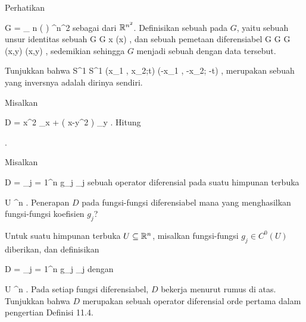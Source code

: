{}
{

Perhatikan

\mavergleichskette
{\vergleichskette
{G
}
{ = }{ _{  n   } \! \left(  \R  \right)
}
{ \subseteq }{ \R^{n^2}
}
{    }{
}
{   }{
}
}
{}{}{}
sebagai
dari ${\mathbb R}^{n^2}$. Definisikan sebuah  {} pada $G$, yaitu sebuah unsur identitas
 sebuah
\maabbeledisp {\alpha} { G } { G
} { x } { \alpha (x)
} {,}
dan sebuah pemetaan diferensiabel
\maabbeledisp {\varphi} {G \times G} {G
} {(x,y)} { \varphi(x,y)
} {,}
sedemikian sehingga $G$ menjadi sebuah
dengan data tersebut.

}
{} {}

{}
{

Tunjukkan bahwa
\maabbeledisp {\varphi} {S^1 \times \R } { S^1 \times \R
} {(x_1 , x_2;t)} {(-x_1 , -x_2; -t)
} {,}
merupakan sebuah
 yang inversnya adalah dirinya sendiri.

}
{} {}

{}
{

Misalkan

\mavergleichskette
{\vergleichskette
{ D
}
{ = }{ x^2 \partial_x +  \left(  x-y^2  \right) \partial_y
}
{  }{
}
{    }{
}
{   }{
}
}
{}{}{.}
Hitung

 { . }

}
{} {}

{}
{

Misalkan

\mavergleichskette
{\vergleichskette
{ D
}
{ = }{ \sum_{j = 1}^n g_j \partial_j
}
{  }{
}
{    }{
}
{   }{
}
}
{}{}{}
sebuah operator diferensial pada suatu himpunan terbuka

\mavergleichskette
{\vergleichskette
{ U
}
{ \subseteq }{ \R^n
}
{  }{
}
{    }{
}
{   }{
}
}
{}{}{.}
Penerapan $D$ pada fungsi-fungsi diferensiabel mana yang menghasilkan fungsi-fungsi koefisien $g_j$?

}
{} {}

{}
{

Untuk suatu himpunan terbuka $U\subseteq{\mathbb R}^n$, misalkan fungsi-fungsi $g_j\in C^0(U)$ diberikan, dan definisikan

\mavergleichskette
{\vergleichskette
{ D
}
{ = }{ \sum_{j = 1}^n g_j \partial_j
}
{  }{
}
{    }{
}
{   }{
}
}
{}{}{}
dengan

\mavergleichskette
{\vergleichskette
{ U
}
{ \subseteq }{ \R^n
}
{  }{
}
{    }{
}
{   }{
}
}
{}{}{.}
Pada setiap fungsi diferensiabel, $D$ bekerja menurut rumus di atas. Tunjukkan bahwa $D$ merupakan sebuah operator diferensial orde pertama dalam pengertian
Definisi 11.4.

}
{} {}

